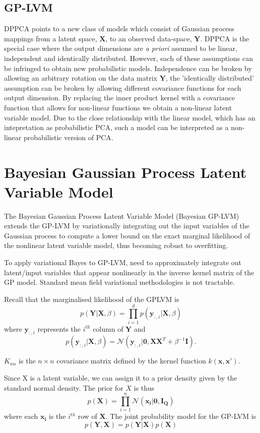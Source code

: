 \documentclass[ %
                    author={Dillon Keith Diep},
                supervisor={Dr. Carl Henrik Ek},
                    degree={MEng},
                     title={Assisted Content Generation for 3D Hair Geometry},
                  subtitle={[INCOMPLETE DRAFT, CONTAINS NOTES FROM RESEARCH]},
                      type={Research},
                      year={2014} ]{dissertation}
\begin{document}
\subsection{GP-LVM}

DPPCA points to a new class of models which consist of Gaussian process mappings from a latent space, $\mathbf{X}$, to an observed data-space, $\mathbf{Y}$. DPPCA is the special case where the output dimensions are \textit{a priori} assumed to be linear, independent and identically distributed. However, each of these assumptions can be infringed to obtain new probabilistic models. Independence can be broken by allowing an arbitrary rotation on the data matrix $\mathbf{Y}$, the 'identically distributed' assumption can be broken by allowing different covariance functions for each output dimension. By replacing the inner product kernel with a covariance function that allows for non-linear functions we obtain a non-linear latent variable model. Due to the close relationship with the linear model, which has an intepretation as probabilistic PCA, such a model can be interpreted as a non-linear probabilistic version of PCA.

\section{Bayesian Gaussian Process Latent Variable Model}
The Bayesian Gaussian Process Latent Variable Model (Bayesian GP-LVM) extends the GP-LVM by variationally integrating out the input variables of the Gaussian process to compute a lower bound on the exact marginal likelihood of the nonlinear latent variable model, thus becoming robust to overfitting. \cite{bgplvm}

To apply variational Bayes to GP-LVM, need to approximately integrate out latent/input variables that appear nonlinearly in the inverse kernel matrix of the GP model. Standard mean field variational methodologies is not tractable.

Recall that the marginalised likelihood of the GPLVM is
$$p(\mathbf{Y|X},\beta)=\prod^d_{i=1}p(\mathbf{y}_{:,i}|\mathbf{X},\beta)$$
where $\mathbf{y}_{:,i}$ represents the $i^{th}$ column of $\mathbf{Y}$ and
$$p(\mathbf{y}_{:,i}|\mathbf{X},\beta)=\mathcal{N}(\mathbf{y}_{:,i}|\mathbf{0,XX}^T+\beta^{-1}\mathbf{I}).$$

$K_{nn}$ is the $n \times n$ covariance matrix defined by the kernel function $k(\mathbf{x,x'})$.

Since X is a latent variable, we can assign it to a prior density given by the standard normal density. The prior for $X$ is thus
$$p(\mathbf{X})=\prod^n_{i=1}\mathcal{N}(\mathbf{x_i|0, I_Q})$$
where each $\mathbf{x_i}$ is the $i^{th}$ row of $\mathbf{X}$. The joint probability model for the GP-LVM is
$$p(\mathbf{Y,X})=p(\mathbf{Y|X})p(\mathbf{X})$$
\end{document}
